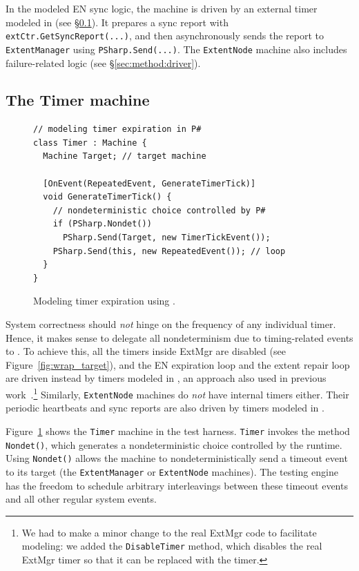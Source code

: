 In the modeled EN sync logic, the machine is driven by an external timer modeled in \psharp (see \S\ref{sec:method:timer}). It prepares a sync report with \texttt{extCtr.GetSyncReport(...)}, and then asynchronously sends the report to \texttt{ExtentManager} using \texttt{PSharp.Send(...)}. The \texttt{ExtentNode} machine also includes failure-related logic (see \S\ref{sec:method:driver}).

\subsection{The Timer machine}
\label{sec:method:timer}

\begin{figure}[t]
\begin{lstlisting}
// modeling timer expiration in P#
class Timer : Machine {
  Machine Target; // target machine

  [OnEvent(RepeatedEvent, GenerateTimerTick)]
  void GenerateTimerTick() {
    // nondeterministic choice controlled by P#
    if (PSharp.Nondet())
      PSharp.Send(Target, new TimerTickEvent());
    PSharp.Send(this, new RepeatedEvent()); // loop
  }
}
\end{lstlisting}
\vspace{-5mm}
\caption{Modeling timer expiration using \psharp.}
\label{fig:modeled_timer}
\vspace{-2mm}
\end{figure}

System correctness should \emph{not} hinge on the frequency of any individual timer. Hence, it makes sense to delegate all nondeterminism due to timing-related events to \psharp. To achieve this, all the timers inside ExtMgr are disabled (see Figure~\ref{fig:wrap_target}), and the EN expiration loop and the extent repair loop are driven instead by timers modeled in \psharp, an approach also used in previous work~\cite{desai2015building}.\footnote{We had to make a minor change to the real ExtMgr code to facilitate modeling: we added the \texttt{DisableTimer} method, which disables the real ExtMgr timer so that it can be replaced with the \psharp timer.}
Similarly, \texttt{ExtentNode} machines do {\em not} have internal timers either. Their periodic heartbeats and sync reports are also driven by timers modeled in \psharp.

Figure~\ref{fig:modeled_timer} shows the \texttt{Timer} machine in the test harness. \texttt{Timer} invokes the \psharp method \texttt{Nondet()}, which generates a nondeterministic choice controlled by the \psharp runtime. Using \texttt{Nondet()} allows the machine to nondeterministically send a timeout event to its target (the \texttt{ExtentManager} or \texttt{ExtentNode} machines). The \psharp testing engine has the freedom to schedule arbitrary interleavings between these timeout events and all other regular system events.

